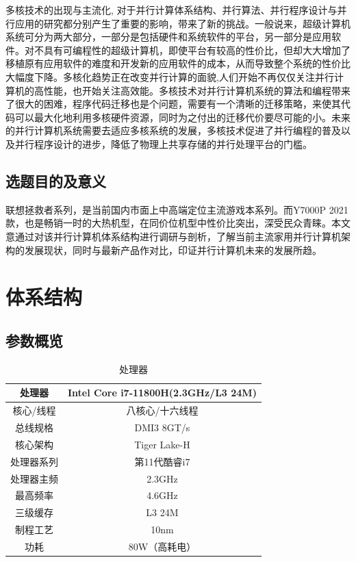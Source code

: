 \documentclass[a4paper]{article}
\begin{document}
多核技术的出现与主流化, 对于并行计算体系结构、并行算法、并行程序设计与并行应用的研究都分别产生了重要的影响，带来了新的挑战。一般说来，超级计算机系统可分为两大部分，一部分是包括硬件和系统软件的平台，另一部分是应用软件。对不具有可编程性的超级计算机，即使平台有较高的性价比，但却大大增加了移植原有应用软件的难度和开发新的应用软件的成本，从而导致整个系统的性价比大幅度下降。多核化趋势正在改变并行计算的面貌,人们开始不再仅仅关注并行计算机的高性能，也开始关注高效能。多核技术对并行计算机系统的算法和编程带来了很大的困难，程序代码迁移也是个问题，需要有一个清晰的迁移策略，来使其代码可以最大化地利用多核硬件资源，同时为之付出的迁移代价要尽可能的小。未来的并行计算机系统需要去适应多核系统的发展，多核技术促进了并行编程的普及以及并行程序设计的进步，降低了物理上共享存储的并行处理平台的门槛。

\subsection{选题目的及意义}
联想拯救者系列，是当前国内市面上中高端定位主流游戏本系列。而Y7000P 2021款，也是畅销一时的大热机型，在同价位机型中性价比突出，深受民众青睐。本文意通过对该并行计算机体系结构进行调研与剖析，了解当前主流家用并行计算机架构的发展现状，同时与最新产品作对比，印证并行计算机未来的发展所趋。

\section{体系结构}
\subsection{参数概览}
\begin{table}[!htbp]
\centering
\begin{tabular}{|c|c|}
\hline
处理器&Intel Core i7-11800H(2.3GHz/L3 24M)\\
\hline
核心/线程& 八核心/十六线程\\
\hline
总线规格& DMI3 8GT/s\\
\hline
核心架构& Tiger Lake-H\\
\hline
处理器系列& 第11代酷睿i7\\
\hline
处理器主频& 2.3GHz\\
\hline
最高频率& 4.6GHz\\
\hline
三级缓存& L3 24M\\
\hline
制程工艺& 10nm\\
\hline
功耗& 80W（高耗电）\\
\hline
\end{tabular}
\caption{处理器}
\end{table}
\end{document}
